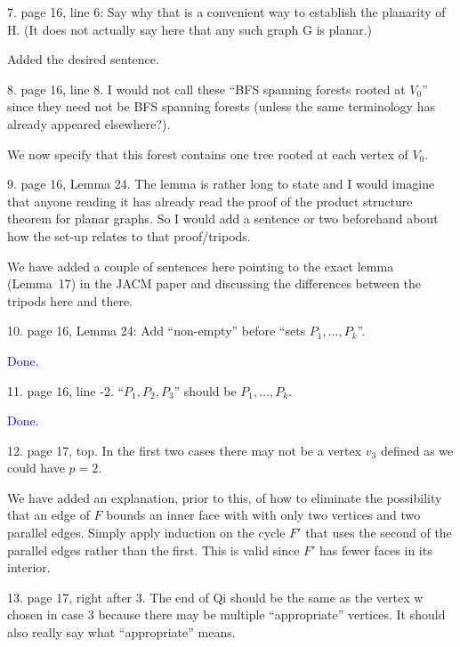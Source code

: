 \documentclass[12pt]{article}
\newcommand{\done}{\textcolor{blue}{Done.}}
\newenvironment{response}{\color{blue}}{}
\begin{document}
7. page 16, line 6: Say why that is a convenient way to establish the
planarity of H. (It does not actually say here that any such graph G
is planar.)

\begin{response}
	Added the desired sentence.
\end{response}

8. page 16, line 8. I would not call these “BFS spanning forests rooted
at $V_0$” since they need not be BFS spanning forests (unless the same
terminology has already appeared elsewhere?).

\begin{response}
  We now specify that this forest contains one tree rooted at each vertex of $V_0$.
\end{response}

9. page 16, Lemma 24. The lemma is rather long to state and I would
imagine that anyone reading it has already read the proof of the product
structure theorem for planar graphs. So I would add a sentence or two
beforehand about how the set-up relates to that proof/tripods.

\begin{response}
  We have added a couple of sentences here pointing to the exact lemma (Lemma~17) in the JACM paper and discussing the differences between the tripods here and there.
\end{response}

10. page 16, Lemma 24: Add “non-empty” before “sets $P_1,\dots,P_k$”.

\done

11. page 16, line -2. “$P_1, P_2, P_3$” should be $P_1,\dots,P_k$.

\done

12. page 17, top. In the first two cases there may not be a vertex $v_3$ defined
as we could have $p=2$.

\begin{response}
  We have added an explanation, prior to this, of how to eliminate the possibility that an edge of $F$ bounds an inner face with with only two vertices and two parallel edges.  Simply apply induction on the cycle $F'$ that uses the second of the parallel edges rather than the first.  This is valid since $F'$ has fewer faces in its interior.
\end{response}


13. page 17, right after 3. The end of Qi should be the same as the vertex w
chosen in case 3 because there may be multiple “appropriate” vertices.
It should also really say what “appropriate” means.
\end{document}
